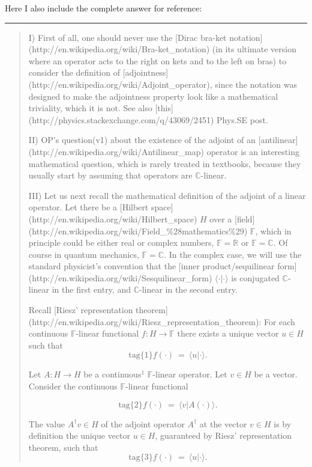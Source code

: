 \documentclass{article}
\numberwithin{equation}{subsection} %
\theoremstyle{definition}
\begin{document}
    Here I also include the complete answer for reference:
    \begin{center}\noindent\rule{8cm}{0.4pt}\end{center}
    \begin{quote}
        I) First of all, one should never use the [Dirac bra-ket notation](http://en.wikipedia.org/wiki/Bra-ket\_notation) (in its ultimate version where an operator acts to the right on kets and to the left on bras) to consider the definition of [adjointness](http://en.wikipedia.org/wiki/Adjoint\_operator), since the notation was designed to make the adjointness property look like a mathematical triviality, which it is not. See also [this](http://physics.stackexchange.com/q/43069/2451) Phys.SE post.

        II) OP's question(v1) about the existence of the adjoint of an [antilinear](http://en.wikipedia.org/wiki/Antilinear\_map) operator is an interesting mathematical question, which is rarely treated in textbooks, because they usually start by assuming that operators are $\mathbb{C}$-linear. 

        III) Let us next recall the mathematical definition of the adjoint of a linear operator. Let there be a [Hilbert space](http://en.wikipedia.org/wiki/Hilbert\_space) $H$ over a [field](http://en.wikipedia.org/wiki/Field\_\%28mathematics\%29) $\mathbb{F}$, which in principle could be either real or complex numbers, $\mathbb{F}=\mathbb{R}$ or $\mathbb{F}=\mathbb{C}$. Of course in quantum mechanics, $\mathbb{F}=\mathbb{C}$. In the complex case, we will use the standard physicist's convention that the [inner product/sequilinear form](http://en.wikipedia.org/wiki/Sesquilinear\_form) $\langle \cdot | \cdot \rangle$ is conjugated $\mathbb{C}$-linear in the first entry, and $\mathbb{C}$-linear in the second entry.

        Recall [Riesz' representation theorem](http://en.wikipedia.org/wiki/Riesz\_representation\_theorem): For each continuous $\mathbb{F}$-linear functional $f: H \to \mathbb{F}$ there exists a unique vector $u\in H$ such that
        $$\text{tag\{1\}} f(\cdot)~=~\langle u | \cdot \rangle.$$

        Let $A:H\to H$ be a continuous$^1$ $\mathbb{F}$-linear operator. Let $v\in H$ be a vector. Consider the continuous $\mathbb{F}$-linear functional 

        $$\text{tag\{2\}} f(\cdot)~=~\langle v | A(\cdot) \rangle.$$ 

        The value $A^{\dagger}v\in H$ of the adjoint operator $A^{\dagger}$ at the vector $v\in H$ is by definition the unique vector $u\in H$, guaranteed by Riesz' representation theorem, such that 
        $$\text{tag\{3\}} f(\cdot)~=~\langle u | \cdot \rangle.$$


\end{quote}
\end{document}

